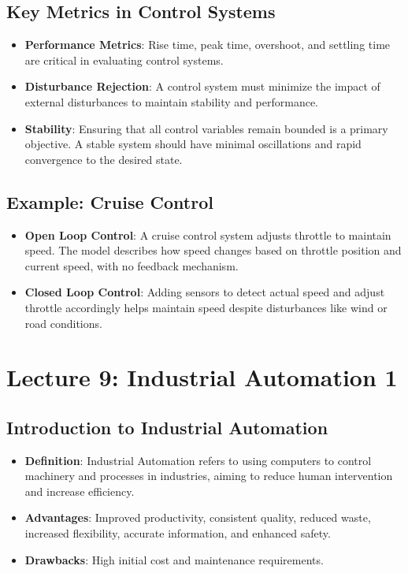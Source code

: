 \documentclass[
  14pt,
  a4paper,
  DIV=11,
  numbers=noendperiod,
  headinclude=true,
  footinclude=true]{scrreprt}
\providecommand{\tightlist}{%
  \setlength{\itemsep}{0pt}\setlength{\parskip}{0pt}}\usepackage{longtable,booktabs,array}
\begin{document}
\section{Key Metrics in Control
Systems}\label{key-metrics-in-control-systems}

\begin{itemize}
\tightlist
\item
  \textbf{Performance Metrics}: Rise time, peak time, overshoot, and
  settling time are critical in evaluating control systems.
\item
  \textbf{Disturbance Rejection}: A control system must minimize the
  impact of external disturbances to maintain stability and performance.
\item
  \textbf{Stability}: Ensuring that all control variables remain bounded
  is a primary objective. A stable system should have minimal
  oscillations and rapid convergence to the desired state.
\end{itemize}

\section{Example: Cruise Control}\label{example-cruise-control}

\begin{itemize}
\tightlist
\item
  \textbf{Open Loop Control}: A cruise control system adjusts throttle
  to maintain speed. The model describes how speed changes based on
  throttle position and current speed, with no feedback mechanism.
\item
  \textbf{Closed Loop Control}: Adding sensors to detect actual speed
  and adjust throttle accordingly helps maintain speed despite
  disturbances like wind or road conditions.
\end{itemize}

\chapter{Lecture 9: Industrial Automation
1}\label{lecture-9-industrial-automation-1}

\section{Introduction to Industrial
Automation}\label{introduction-to-industrial-automation}

\begin{itemize}
\tightlist
\item
  \textbf{Definition}: Industrial Automation refers to using computers
  to control machinery and processes in industries, aiming to reduce
  human intervention and increase efficiency.
\item
  \textbf{Advantages}: Improved productivity, consistent quality,
  reduced waste, increased flexibility, accurate information, and
  enhanced safety.
\item
  \textbf{Drawbacks}: High initial cost and maintenance requirements.
\end{itemize}
\end{document}
